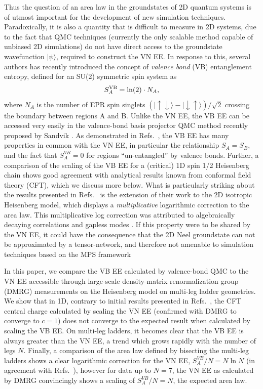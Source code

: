 \documentclass[prl,aps,twocolumn,floatfix,amsmath,amssymb,superscriptaddress,tightenlines]{revtex4}
\begin{document}
Thus the question of an area law in the groundstates of 2D quantum systems is of utmost important for the development of new simulation techniques.  Paradoxically, it is also a quantity that is difficult to measure in 2D systems, due to the fact that QMC techniques (currently the only scalable method capable of unbiased 2D simulations) do not have direct access to the groundstate wavefunction $| \psi \rangle$, required to construct the VN EE.  In response to this, several authors \cite{Alet, Chh} has recently introduced the concept of {\it valence bond} (VB) entanglement entropy, defined for an SU(2) symmetric spin system as
\begin{equation}
S^{\rm VB}_A = \ln(2) \cdot N_A,
\end{equation}
where $N_A$ is the number of EPR spin singlets ${( |\uparrow \downarrow \rangle - | \downarrow \uparrow \rangle)/\sqrt{2}}$ crossing the boundary between regions A and B.  Unlike the VN EE, the VB EE can be accessed very easily in the valence-bond basis projector QMC method recently proposed by Sandvik \cite{Sandvik}.  
As demonstrated in Refs.~\cite{Alet,Chh}, the VB EE has many properties in common with the VN EE, in particular the relationship $S_A = S_B$, and the fact that $S^{VB}_A=0$ for regions ``un-entangled'' by valence bonds.  Further, a comparison of the scaling of the VB EE for a (critical) 1D spin 1/2 Heisenberg chain shows good agreement with analytical results known from conformal field theory (CFT), which we discuss more below.
What is particularly striking about the results presented in Refs.~\cite{Alet,Chh} is the extension of their work to the 2D isotropic Heisenberg model, which displays a {\it multiplicative} logarithmic correction to the area law.  This multiplicative log correction was attributed to algebraically decaying correlations \cite{Chh} and gapless modes \cite{Alet}.
 If this property were to be shared by the VN EE, it could have the consequence that the 2D Neel groundstate can not be approximated by a tensor-network, and therefore not amenable to simulation techniques based on the MPS framework
 
In this paper, we compare the VB EE calculated by valence-bond QMC to the VN EE accessible through large-scale density-matrix renormalization group (DMRG) measurements on the Heisenberg model on multi-leg ladder geometries.    We show that in 1D, contrary to initial results presented in Refs.~\cite{Alet,Chh}, the CFT central charge calculated by scaling the VN EE (confirmed with DMRG to converge to $c=1$) does not converge to the expected result when calculated by scaling the VB EE.  On multi-leg ladders, it becomes clear that the VB EE is always greater than the VN EE, a trend which grows rapidly with the number of legs $N$.  Finally, a comparison of the area law defined by bisecting the multi-leg ladders shows a clear logarithmic correction for the VN EE, $S^{VB}_A /N = N \ln N$ (in agreement with Refs.~\cite{Alet,Chh}), however for data up to $N=7$, the VN EE as calculated by DMRG convincingly shows a scaling of $S^{VB}_A /N = N$, the expected area law.
\end{document}
